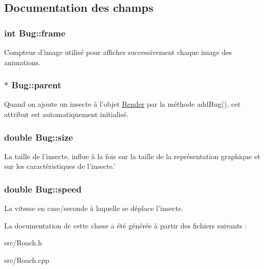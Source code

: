 \subsection{Documentation des champs}
\hypertarget{classBug_ad7e3597cf049f1051be94fcaf2fd3598}{
\subsubsection[{frame}]{\setlength{\rightskip}{0pt plus 5cm}int {\bf Bug::frame}}}
\label{classBug_ad7e3597cf049f1051be94fcaf2fd3598}
Compteur d'image utilisé pour afficher successivement chaque image des animations. \hypertarget{classBug_a7a93aae4e4b7a215c94ff85d0bd6e26d}{
\subsubsection[{parent}]{$\ast$ {\bf Bug::parent}}}
\label{classBug_a7a93aae4e4b7a215c94ff85d0bd6e26d}
Quand on ajoute un insecte à l'objet \hyperlink{classRender}{Render} par la méthode addBug(), cet attribut est automatiquement initialisé. \hypertarget{classBug_a27a0f0b84d15525e409955509e6e3c42}{
\subsubsection[{size}]{\setlength{\rightskip}{0pt plus 5cm}double {\bf Bug::size}}}
\label{classBug_a27a0f0b84d15525e409955509e6e3c42}
La taille de l'insecte, influe à la fois sur la taille de la représentation graphique et sur les caractéristiques de l'insecte.' \hypertarget{classBug_a13b95fbf23748ea853b01bfd0b0e7fc8}{
\subsubsection[{speed}]{\setlength{\rightskip}{0pt plus 5cm}double {\bf Bug::speed}}}
\label{classBug_a13b95fbf23748ea853b01bfd0b0e7fc8}
La vitesse en case/seconde à laquelle se déplace l'insecte. 

La documentation de cette classe a été générée à partir des fichiers suivants :\begin{DoxyCompactItemize}
\item 
src/Roach.h\item 
src/Roach.cpp\end{DoxyCompactItemize}
